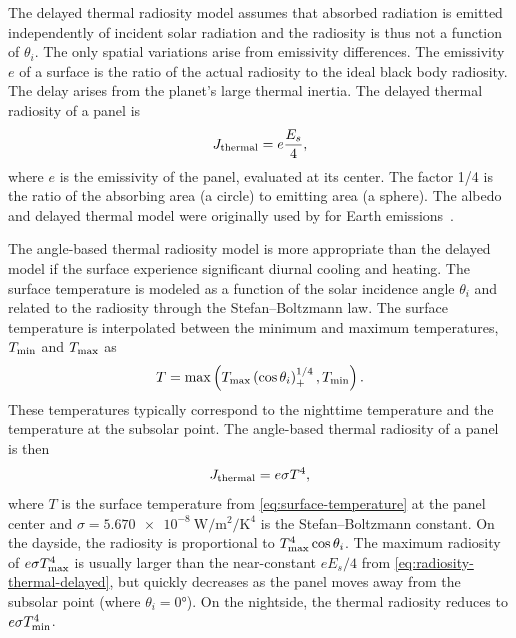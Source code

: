 The delayed thermal radiosity model assumes that absorbed radiation is emitted independently of incident solar radiation and the radiosity is thus not a function of $\theta_i$. The only spatial variations arise from emissivity differences. The emissivity $e$ of a surface is the ratio of the actual radiosity to the ideal black body radiosity. The delay arises from the planet's large thermal inertia. The delayed thermal radiosity of a panel is~\cite{Knocke1988}
\begin{align}
    \label{eq:radiosity-thermal-delayed}
    J_\textnormal{thermal} = e \frac{E_s}{4},
\end{align}
where $e$ is the emissivity of the panel, evaluated at its center. The factor 1/4 is the ratio of the absorbing area (a circle) to emitting area (a sphere). The albedo and delayed thermal model were originally used by \citeauthor{Knocke1988} for Earth emissions~\cite{Knocke1988}.

The angle-based thermal radiosity model is more appropriate than the delayed model if the surface experience significant diurnal cooling and heating. The surface temperature is modeled as a function of the solar incidence angle $\theta_i$ and related to the radiosity through the Stefan--Boltzmann law. The surface temperature is interpolated between the minimum and maximum temperatures, $T_\textnormal{min}$ and $T_\textnormal{max}$ as
\begin{align}
    \label{eq:surface-temperature}
    T = \max\left( T_\textnormal{max} \left(\cos\theta_i\right)_+^{1/4}, T_\textnormal{min} \right).
\end{align}
These temperatures typically correspond to the nighttime temperature and the temperature at the subsolar point. The angle-based thermal radiosity of a panel is then~\cite{Lemoine2013}
\begin{align}
    \label{eq:radiosity-thermal-anglebased}
    J_\textnormal{thermal} = e \sigma T^4,
\end{align}
where $T$ is the surface temperature from \cref{eq:surface-temperature} at the panel center and $\sigma = \qty{5.670e-8}{\W\per\m\squared\per\K\tothe{4}}$ is the Stefan--Boltzmann constant. On the dayside, the radiosity is proportional to $T_\textnormal{max}^4\cos\theta_i$. The maximum radiosity of $e \sigma T_\textnormal{max}^4$ is usually larger than the near-constant $e E_s/4$ from \cref{eq:radiosity-thermal-delayed}, but quickly decreases as the panel moves away from the subsolar point (where $\theta_i = \ang{0}$). On the nightside, the thermal radiosity reduces to $e \sigma T_\textnormal{min}^4$.

